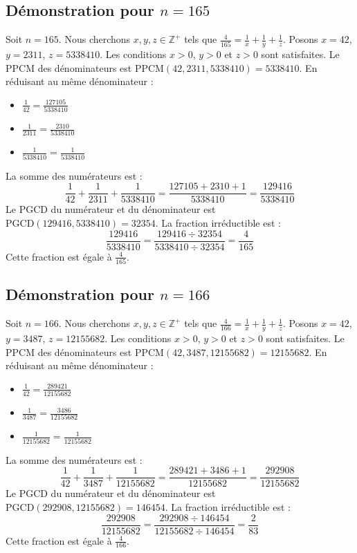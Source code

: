 \documentclass[11pt,a4paper]{article}
\begin{document}
\subsection{Démonstration pour $n = 165$}
Soit $n = 165$. Nous cherchons $x, y, z \in \mathbb{Z}^{+}$ tels que $\frac{4}{165} = \frac{1}{x} + \frac{1}{y} + \frac{1}{z}$.
Posons $x = 42$, $y = 2311$, $z = 5338410$.
Les conditions $x > 0$, $y > 0$ et $z > 0$ sont satisfaites.
Le PPCM des dénominateurs est $\text{PPCM}(42, 2311, 5338410) = 5338410$.
En réduisant au même dénominateur :
\begin{itemize}
    \item $\frac{1}{42} = \frac{127105}{5338410}$
    \item $\frac{1}{2311} = \frac{2310}{5338410}$
    \item $\frac{1}{5338410} = \frac{1}{5338410}$
\end{itemize}
La somme des numérateurs est :
$$ \frac{1}{42} + \frac{1}{2311} + \frac{1}{5338410} = \frac{127105 + 2310 + 1}{5338410} = \frac{129416}{5338410} $$
Le PGCD du numérateur et du dénominateur est $\text{PGCD}(129416, 5338410) = 32354$.
La fraction irréductible est :
$$ \frac{129416}{5338410} = \frac{129416 \div 32354}{5338410 \div 32354} = \frac{4}{165} $$
Cette fraction est égale à $\frac{4}{165}$.

\subsection{Démonstration pour $n = 166$}
Soit $n = 166$. Nous cherchons $x, y, z \in \mathbb{Z}^{+}$ tels que $\frac{4}{166} = \frac{1}{x} + \frac{1}{y} + \frac{1}{z}$.
Posons $x = 42$, $y = 3487$, $z = 12155682$.
Les conditions $x > 0$, $y > 0$ et $z > 0$ sont satisfaites.
Le PPCM des dénominateurs est $\text{PPCM}(42, 3487, 12155682) = 12155682$.
En réduisant au même dénominateur :
\begin{itemize}
    \item $\frac{1}{42} = \frac{289421}{12155682}$
    \item $\frac{1}{3487} = \frac{3486}{12155682}$
    \item $\frac{1}{12155682} = \frac{1}{12155682}$
\end{itemize}
La somme des numérateurs est :
$$ \frac{1}{42} + \frac{1}{3487} + \frac{1}{12155682} = \frac{289421 + 3486 + 1}{12155682} = \frac{292908}{12155682} $$
Le PGCD du numérateur et du dénominateur est $\text{PGCD}(292908, 12155682) = 146454$.
La fraction irréductible est :
$$ \frac{292908}{12155682} = \frac{292908 \div 146454}{12155682 \div 146454} = \frac{2}{83} $$
Cette fraction est égale à $\frac{4}{166}$.
\end{document}
